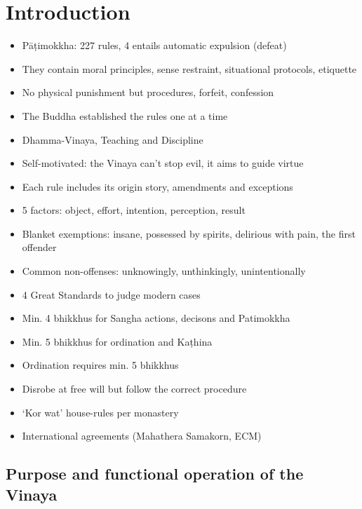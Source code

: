 \chapter{Introduction}

\begin{itemize}
\tightlist
\item
  Pāṭimokkha: 227 rules, 4 entails automatic expulsion (defeat)
\item
  They contain moral principles, sense restraint, situational protocols,
  etiquette
\item
  No physical punishment but procedures, forfeit, confession
\item
  The Buddha established the rules one at a time
\item
  Dhamma-Vinaya, Teaching and Discipline
\item
  Self-motivated: the Vinaya can't stop evil, it aims to guide virtue
\item
  Each rule includes its origin story, amendments and exceptions
\item
  5 factors: object, effort, intention, perception, result
\item
  Blanket exemptions: insane, possessed by spirits, delirious with pain,
  the first offender
\item
  Common non-offenses: unknowingly, unthinkingly, unintentionally
\item
  4 Great Standards to judge modern cases
\item
  Min. 4 bhikkhus for Sangha actions, decisons and Patimokkha
\item
  Min. 5 bhikkhus for ordination and Kaṭhina
\item
  Ordination requires min. 5 bhikkhus
\item
  Disrobe at free will but follow the correct procedure
\item
  `Kor wat' house-rules per monastery
\item
  International agreements (Mahathera Samakorn, ECM)
\end{itemize}

\section{Purpose and functional operation of the Vinaya}

